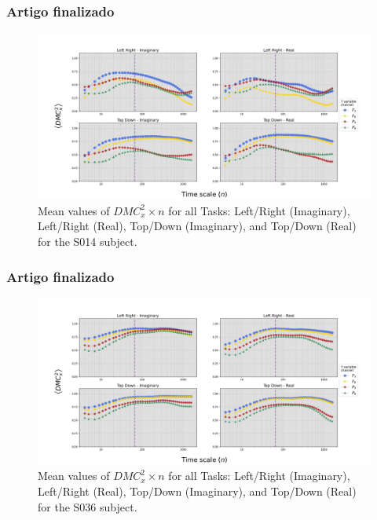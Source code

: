 \documentclass[11pt, aspectratio=169]{beamer}
\begin{document}
  \begin{frame}
    \frametitle{Artigo finalizado}
  
\begin{figure}[!h]
	\includegraphics[height=.5\paperheight]{../Figures/art_02/Fig3.jpg}
	\caption{Mean values of $DMC_{x}^{2} \times n$ for all Tasks: Left/Right (Imaginary), Left/Right (Real), Top/Down (Imaginary), and Top/Down (Real) for the S014 subject.}
	\label{fig03}
\end{figure}
  \end{frame}


  \begin{frame}
    \frametitle{Artigo finalizado}
  
\begin{figure}[!h]
	\includegraphics[height=.5\paperheight]{../Figures/art_02/Fig4.jpg}
	\caption{Mean values of $DMC_{x}^{2} \times n$ for all Tasks: Left/Right (Imaginary), Left/Right (Real), Top/Down (Imaginary), and Top/Down (Real) for the S036 subject.}
	\label{fig04}
\end{figure}
  \end{frame}
\end{document}
